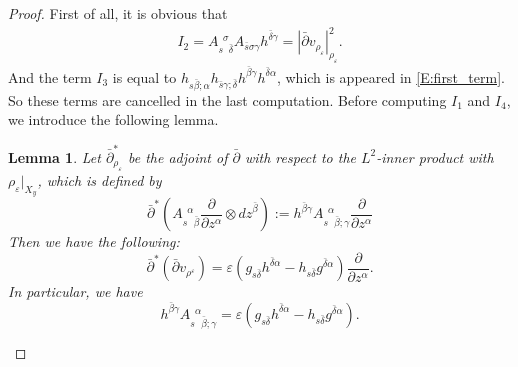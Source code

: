 \documentclass{amsart}
\newtheorem{lemma}[theorem]{Lemma}
\theoremstyle{definition}
\numberwithin{equation}{section}
\begin{document}
\begin{proof}
First of all, it is obvious that 
\begin{align*}
I_2
=
A{_{{s}\phantom{{\sigma}}{\bar\delta}}^{\phantom{{s}}{\sigma}}}A_{\bar{s}\sigma\gamma}h^{\bar\delta\gamma}
=
{\left\vert{\bar\partial{v_{\rho_{\varepsilon}}}}\right\vert}_{\rho_{\varepsilon}}^2.
\end{align*}
And the term $I_3$ is equal to $h_{s\bar\beta;\alpha}h_{\bar{s}\gamma;\bar\delta}h^{\bar\beta\gamma}h^{\bar\delta\alpha}$, which is appeared in \eqref{E:first_term}. So these terms are cancelled in the last computation.
Before computing $I_1$ and $I_4$, we introduce the following lemma.

\begin{lemma} \label{L:harmonic}
Let $\bar\partial^*_{\rho_{\varepsilon}}$ be the adjoint of $\bar\partial$ with respect to the $L^2$-inner product with  $\rho_\varepsilon\vert_{X_y}$, which is defined by 
\begin{equation*}
\bar\partial^*{\left({A{_{{s}\phantom{{\alpha}}{\bar\beta}}^{\phantom{{s}}{\alpha}}}
{\frac{\partial{}}{\partial{z^\alpha}}}\otimes{dz}^{\bar\beta}}\right)}
	:=h^{\bar\beta\gamma}A{_{{s}\phantom{{\alpha}}{\bar\beta;\gamma}}^{\phantom{{s}}{\alpha}}}{\frac{\partial{}}{\partial{z^\alpha}}}
\end{equation*}
Then we have the following:
\begin{equation}\label{E:dbarstar}
\bar\partial^*
{\left({
\bar\partial v_{\rho^\varepsilon}
}\right)}
=
\varepsilon
{\left({
	g_{s\bar\delta}h^{\bar\delta\alpha}
	-h_{s\bar\delta}g^{\bar\delta\alpha}
}\right)}
{\frac{\partial{}}{\partial{z^\alpha}}}.
\end{equation}
In particular, we have
\begin{equation*}
h^{\bar\beta\gamma}A{_{{s}\phantom{{\alpha}}{\bar\beta;\gamma}}^{\phantom{{s}}{\alpha}}}
=
\varepsilon
{\left({
	g_{s\bar\delta}h^{\bar\delta\alpha}
	-h_{s\bar\delta}g^{\bar\delta\alpha}
}\right)}.
\end{equation*}
\end{lemma}


\end{proof}
\end{document}

